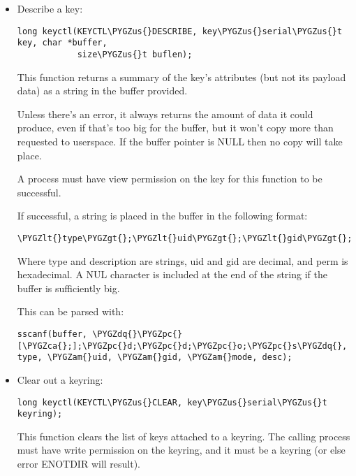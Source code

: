 \documentclass[a4paper,8pt,english]{sphinxmanual}
\def\PYGZus{\char`\_}
\def\PYGZca{\char`\^}
\def\PYGZam{\char`\&}
\def\PYGZlt{\char`\<}
\def\PYGZgt{\char`\>}
\def\PYGZpc{\char`\%}
\def\PYGZdq{\char`\"}
\begin{document}
\begin{itemize}
\item {} 
Describe a key:

\begin{Verbatim}[commandchars=\\\{\}]
long keyctl(KEYCTL\PYGZus{}DESCRIBE, key\PYGZus{}serial\PYGZus{}t key, char *buffer,
            size\PYGZus{}t buflen);
\end{Verbatim}

This function returns a summary of the key's attributes (but not its
payload data) as a string in the buffer provided.

Unless there's an error, it always returns the amount of data it could
produce, even if that's too big for the buffer, but it won't copy more
than requested to userspace. If the buffer pointer is NULL then no copy
will take place.

A process must have view permission on the key for this function to be
successful.

If successful, a string is placed in the buffer in the following format:

\begin{Verbatim}[commandchars=\\\{\}]
\PYGZlt{}type\PYGZgt{};\PYGZlt{}uid\PYGZgt{};\PYGZlt{}gid\PYGZgt{};\PYGZlt{}perm\PYGZgt{};\PYGZlt{}description\PYGZgt{}
\end{Verbatim}

Where type and description are strings, uid and gid are decimal, and perm
is hexadecimal. A NUL character is included at the end of the string if
the buffer is sufficiently big.

This can be parsed with:

\begin{Verbatim}[commandchars=\\\{\}]
sscanf(buffer, \PYGZdq{}\PYGZpc{}[\PYGZca{};];\PYGZpc{}d;\PYGZpc{}d;\PYGZpc{}o;\PYGZpc{}s\PYGZdq{}, type, \PYGZam{}uid, \PYGZam{}gid, \PYGZam{}mode, desc);
\end{Verbatim}

\item {} 
Clear out a keyring:

\begin{Verbatim}[commandchars=\\\{\}]
long keyctl(KEYCTL\PYGZus{}CLEAR, key\PYGZus{}serial\PYGZus{}t keyring);
\end{Verbatim}

This function clears the list of keys attached to a keyring. The calling
process must have write permission on the keyring, and it must be a
keyring (or else error ENOTDIR will result).


\end{itemize}
\end{document}
